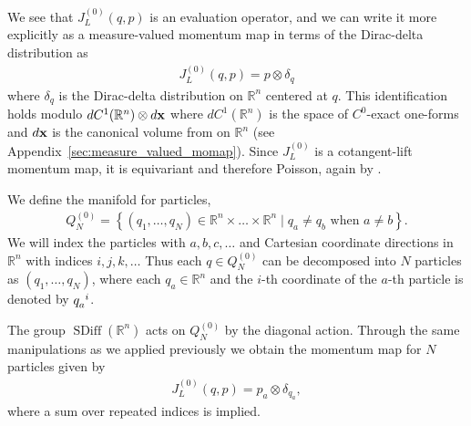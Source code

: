 \documentclass[12pt]{amsart}
\newcommand{\R}{\ensuremath{\mathbb{R}}}
\newcommand{\dx}{\ensuremath{\textrm{d}x}}
\DeclareMathOperator{\SDiff}{SDiff}
\begin{document}
We see that $J_L^{(0)}(q,p)$ is an evaluation operator, and we can write it 
more explicitly as a measure-valued momentum map in terms of the Dirac-delta distribution as
\begin{align*}
  J_L^{(0)}( q , p ) = p \otimes \delta_q
\end{align*}
where $\delta_q$ is the Dirac-delta distribution on $\R^n$ centered at $q$.
This identification holds modulo $dC^1(\R^n) \otimes d{\bf x}$ where $dC^1(\R^n)$
is the space of $C^0$-exact one-forms and $d{\bf x}$ is the canonical volume from on $\R^n$
(see Appendix~\ref{sec:measure_valued_momap}).
Since $J_L^{(0)}$ is a cotangent-lift momentum map, it is equivariant and therefore Poisson, again by \cite[Thm~12.4.9]{MandS}.

We define the manifold for particles,
\begin{align*}
  Q_N^{(0)} = \left\{ (q_1,\dots,q_N) \in \R^n \times \dots\times \R^n
                 \mid q_a \neq q_b \text{ when } a \neq b \right\}.
\end{align*}
We will index the particles with $a,b,c,\dots$ and Cartesian coordinate
directions in $\R^n$ with indices $i,j,k,\dots$
Thus each $q \in Q_N^{(0)}$ can be decomposed
into $N$ particles as $(q_1,\dots,q_N)$, where each $q_a \in \R^n$
and the $i$-th coordinate of the $a$-th particle
is denoted by $q\indices{_a^i}$.

The group $\SDiff(\R^n)$ acts on $Q_N^{(0)}$ by the diagonal action.
Through the same manipulations as we applied previously we obtain the
momentum map for $N$ particles given by
\begin{align*}
  J_L^{(0)}(q,p) = p_a \otimes \delta_{q_a},
\end{align*}
where a sum over repeated indices is implied.
\end{document}
